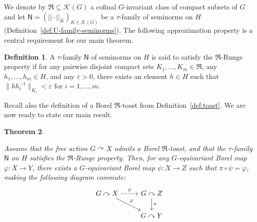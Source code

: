 \documentclass[12pt]{paper}
\numberwithin{equation}{section}
\theoremstyle{plain}
\newtheorem{theorem}{Theorem}[section]
\theoremstyle{definition}
\newtheorem{definition}[theorem]{Definition}
\newcommand{\mfR}{\mathfrak{R}}
\newcommand{\vietoris}[2][]{\mathcal{K}_{#1}(#2)}
\newcommand{\unifn}{\mathsf{N}}
\newcommand{\acts}{\curvearrowright}
\newcommand{\norm}[1]{||#1||}
\renewcommand{\epsilon}{\varepsilon}
\renewcommand{\phi}{\varphi}
\begin{document}
We denote by \(\mfR \subseteq \vietoris{G}\) a cofinal \(G\)-invariant class of compact subsets of
\(G\) and let \(\unifn = (\norm{\cdot}_{K})_{K \in \vietoris{G}}\) be a \(\tau\)-family of seminorms
on \(H\) (Definition~\ref{def:U-family-seminorms}).  The following approximation property is a
central requirement for our main theorem.

\begin{definition}
  \label{def:weak-runge-property}
  A \(\tau\)-family \(\unifn\) of seminorms on \(H\) is said to satisfy the \(\mfR\)-Runge property
  if for any pairwise disjoint compact sets \(K_1,\ldots,K_m\in \mfR\), any
  \(h_1,\ldots, h_m\in H\), and any \(\epsilon>0\), there exists an element \(h\in H\) such that
  \(\lVert h h_i^{-1}\rVert_{K_i}<\epsilon\) for \(i=1,\ldots,m\).
\end{definition}


Recall also the definition of a Borel \(\mfR\)-toast from Definition~\ref{def:toast}.  We are now
ready to state our main result.

\begin{theorem}
  \label{thm:main-theorem}

  Assume that the free action \(G \acts X\) admits a Borel \(\mfR\)-toast, and that the
  \(\tau\)-family \(\unifn\) on \(H\) satisfies the \(\mfR\)-Runge property.  Then, for any
  \(G\)-equivariant Borel map \(\phi : X \to Y\), there exists a \(G\)-equivariant Borel map
  \(\psi : X \to Z\) such that \(\pi \circ \psi = \phi\), making the following diagram commute:
  \begin{displaymath}
    \begin{tikzcd}[ampersand replacement=\&]
      G \acts X \arrow[r, dashed, "\psi"] \arrow[dr, "\phi"]
      \& G \acts Z \arrow[d, "\pi"]\\
      \& G \acts Y
    \end{tikzcd}
  \end{displaymath}
\end{theorem}
\end{document}
